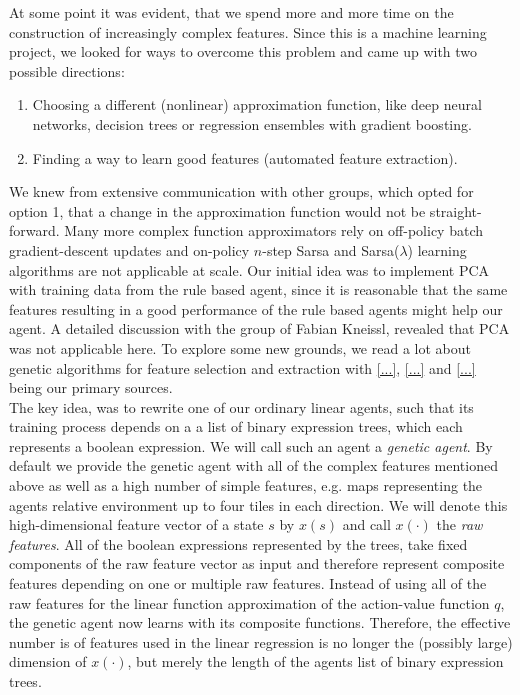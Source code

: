 At some point it was evident, that we spend more and more time on the construction of increasingly complex features. Since this is a machine learning project, we looked for ways to overcome this problem and came up with two possible directions:
\begin{enumerate}
	\item Choosing a different (nonlinear) approximation function, like deep neural networks, decision trees or regression ensembles with gradient boosting.
	\item Finding a way to learn good features (automated feature extraction).
\end{enumerate}
 
We knew from extensive communication with other groups, which opted for option 1, that a change in the approximation function would not be straight-forward. Many more complex function approximators rely on off-policy batch gradient-descent updates and on-policy $n$-step Sarsa and Sarsa($\lambda$) learning algorithms are not applicable at scale. Our initial idea was to implement PCA with training data from the rule based agent, since it is reasonable that the same features resulting in a good performance of the rule based agents might help our agent. A detailed discussion with the group of Fabian Kneissl, revealed that PCA was not applicable here. To explore some new grounds, we read a lot about genetic algorithms for feature selection and extraction with \ref{...}, \ref{...} and \ref{...} being our primary sources. \\

The key idea, was to rewrite one of our ordinary linear agents, such that its training process depends on a a list of binary expression trees, which each represents a boolean expression. We will call such an agent a \emph{genetic agent}. By default we provide the genetic agent with all of the complex features mentioned above as well as a high number of simple features, e.g. maps representing the agents relative environment up to four tiles in each direction. We will denote this high-dimensional feature vector of a state $s$ by $x(s)$ and call $x(\cdot)$ the \emph{raw features}. All of the boolean expressions represented by the trees, take fixed components of the raw feature vector as input and therefore represent composite features depending on one or multiple raw features. Instead of using all of the raw features for the linear function approximation of the action-value function $q$, the genetic agent now learns with its composite functions. Therefore, the effective number is of features used in the linear regression is no longer the (possibly large) dimension of $x(\cdot)$, but merely the length of the agents list of binary expression trees. \\

